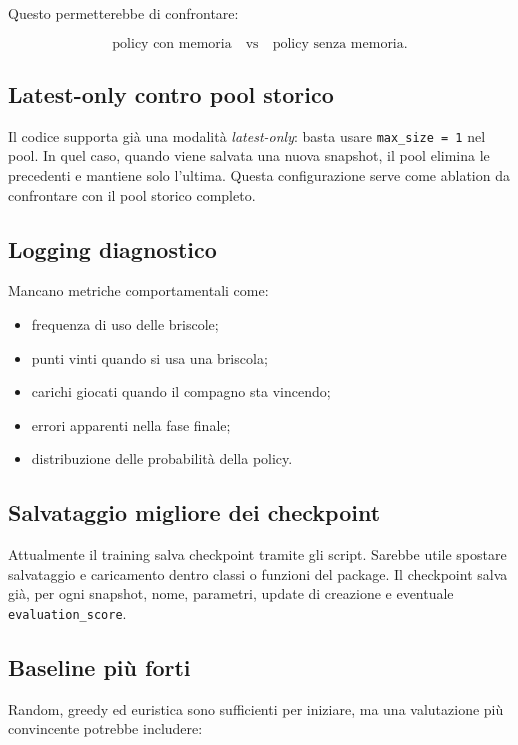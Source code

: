 \documentclass[11pt,a4paper]{article}
\begin{document}
Questo permetterebbe di confrontare:

\[
\text{policy con memoria} \quad \text{vs} \quad \text{policy senza memoria}.
\]

\subsection{Latest-only contro pool storico}

Il codice supporta già una modalità \emph{latest-only}: basta usare
\texttt{max\_size = 1} nel pool. In quel caso, quando viene salvata una nuova
snapshot, il pool elimina le precedenti e mantiene solo l'ultima. Questa
configurazione serve come ablation da confrontare con il pool storico completo.

\subsection{Logging diagnostico}

Mancano metriche comportamentali come:

\begin{itemize}
  \item frequenza di uso delle briscole;
  \item punti vinti quando si usa una briscola;
  \item carichi giocati quando il compagno sta vincendo;
  \item errori apparenti nella fase finale;
  \item distribuzione delle probabilità della policy.
\end{itemize}

\subsection{Salvataggio migliore dei checkpoint}

Attualmente il training salva checkpoint tramite gli script. Sarebbe utile
spostare salvataggio e caricamento dentro classi o funzioni del package. Il
checkpoint salva già, per ogni snapshot, nome, parametri, update di creazione e
eventuale \texttt{evaluation\_score}.

\subsection{Baseline più forti}

Random, greedy ed euristica sono sufficienti per iniziare, ma una valutazione
più convincente potrebbe includere:
\end{document}
